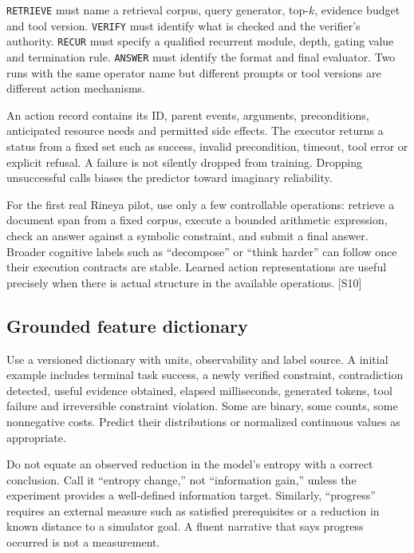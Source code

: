 \documentclass[
  11pt,
  a4paper,
]{article}
\begin{document}
\texttt{RETRIEVE} must name a retrieval corpus, query generator,
top-\(k\), evidence budget and tool version. \texttt{VERIFY} must
identify what is checked and the verifier's authority. \texttt{RECUR}
must specify a qualified recurrent module, depth, gating value and
termination rule. \texttt{ANSWER} must identify the format and final
evaluator. Two runs with the same operator name but different prompts or
tool versions are different action mechanisms.

An action record contains its ID, parent events, arguments,
preconditions, anticipated resource needs and permitted side effects.
The executor returns a status from a fixed set such as success, invalid
precondition, timeout, tool error or explicit refusal. A failure is not
silently dropped from training. Dropping unsuccessful calls biases the
predictor toward imaginary reliability.

For the first real Rineya pilot, use only a few controllable operations:
retrieve a document span from a fixed corpus, execute a bounded
arithmetic expression, check an answer against a symbolic constraint,
and submit a final answer. Broader cognitive labels such as
``decompose'' or ``think harder'' can follow once their execution
contracts are stable. Learned action representations are useful
precisely when there is actual structure in the available operations.
{[}S10{]}

\subsection{Grounded feature
dictionary}\label{grounded-feature-dictionary}

Use a versioned dictionary with units, observability and label source. A
initial example includes terminal task success, a newly verified
constraint, contradiction detected, useful evidence obtained, elapsed
milliseconds, generated tokens, tool failure and irreversible constraint
violation. Some are binary, some counts, some nonnegative costs. Predict
their distributions or normalized continuous values as appropriate.

Do not equate an observed reduction in the model's entropy with a
correct conclusion. Call it ``entropy change,'' not ``information
gain,'' unless the experiment provides a well-defined information
target. Similarly, ``progress'' requires an external measure such as
satisfied prerequisites or a reduction in known distance to a simulator
goal. A fluent narrative that says progress occurred is not a
measurement.
\end{document}
